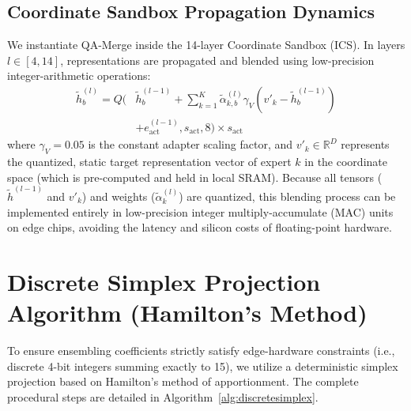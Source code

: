 \documentclass{article}
\theoremstyle{plain}
\theoremstyle{definition}
\theoremstyle{remark}
\begin{document}
\subsection{Coordinate Sandbox Propagation Dynamics}
We instantiate QA-Merge inside the 14-layer Coordinate Sandbox (ICS). In layers $l \in [4, 14]$, representations are propagated and blended using low-precision integer-arithmetic operations:
\begin{equation}
\begin{split}
    \tilde{h}_b^{(l)} = Q\Big( & \tilde{h}_b^{(l-1)} + \sum_{k=1}^K \tilde{\alpha}_{k, b}^{(l)} \gamma_V (v'_k - \tilde{h}_b^{(l-1)}) \\
    & + e^{(l-1)}_{\text{act}}, s_{\text{act}}, 8 \Big) \times s_{\text{act}}
\end{split}
\end{equation}
where $\gamma_V = 0.05$ is the constant adapter scaling factor, and $v'_k \in \mathbb{R}^D$ represents the quantized, static target representation vector of expert $k$ in the coordinate space (which is pre-computed and held in local SRAM). Because all tensors ($\tilde{h}^{(l-1)}$ and $v'_k$) and weights ($\tilde{\alpha}_k^{(l)}$) are quantized, this blending process can be implemented entirely in low-precision integer multiply-accumulate (MAC) units on edge chips, avoiding the latency and silicon costs of floating-point hardware.

\section{Discrete Simplex Projection Algorithm (Hamilton's Method)}
\label{app:discrete_simplex}

To ensure ensembling coefficients strictly satisfy edge-hardware constraints (i.e., discrete 4-bit integers summing exactly to 15), we utilize a deterministic simplex projection based on Hamilton's method of apportionment. The complete procedural steps are detailed in Algorithm~\ref{alg:discretesimplex}.
\end{document}

